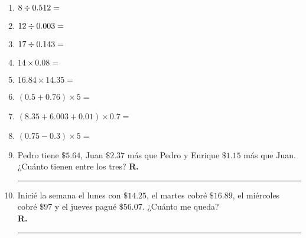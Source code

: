 \begin{enumerate}
\item $8 \divisionsymbol 0.512 =$
\item $12 \divisionsymbol 0.003 =$
\item $17 \divisionsymbol 0.143 =$
\item $14 \times 0.08 =$
\item $16.84 \times 14.35 =$
\item $(0.5 + 0.76) \times 5 =$
\item $(8.35 + 6.003 + 0.01) \times 0.7 =$
\item $(0.75 - 0.3) \times 5 =$
\item Pedro tiene $\$ 5.64$, Juan $\$2.37$ más que Pedro y Enrique $\$1.15$ más que Juan. ¿Cuánto tienen entre los tres? \hspace{0.3cm} \textbf{R.} \rule{3cm}{0.1mm}
\item Inicié la semana el lunes con $\$ 14.25$, el martes cobré $\$ 16.89$, el miércoles cobré $\$ 97$ y el jueves pagué $\$ 56.07$. ¿Cuánto me queda?
\\
\hspace{0.3cm} \textbf{R.} \rule{3cm}{0.1mm}
\end{enumerate}
